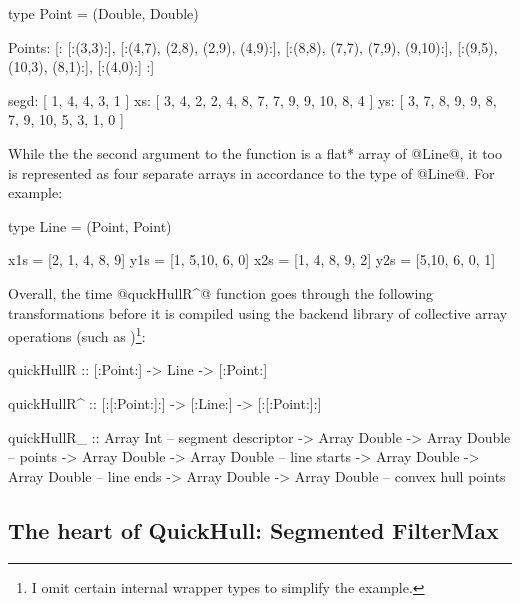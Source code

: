 \documentclass[preamble.tex]{subfiles}
\begin{document}
\begin{hscode}
type Point = (Double, Double)

Points:
  [:
     [:(3,3):],
     [:(4,7), (2,8),  (2,9), (4,9):],
     [:(8,8), (7,7),  (7,9), (9,10):],
     [:(9,5), (10,3), (8,1):],
     [:(4,0):]
  :]


segd: [ 1, 4, 4, 3, 1 ]
xs:   [ 3, 4, 2, 2, 4, 8, 7, 7,  9, 9, 10, 8, 4 ]
ys:   [ 3, 7, 8, 9, 9, 8, 7, 9, 10, 5,  3, 1, 0 ]
\end{hscode}


While the the second argument to the function is a \*flat* array of @Line@, it too is represented as four separate arrays in accordance to the type of @Line@. For example:


\begin{hscode}
type Line = (Point, Point)

x1s = [2, 1, 4, 8, 9]
y1s = [1, 5,10, 6, 0]
x2s = [1, 4, 8, 9, 2]
y2s = [5,10, 6, 0, 1]
\end{hscode}


Overall, the time @quckHullR^@ function goes through the following transformations before it is compiled using the backend library of collective array operations (such as \LiveFusion)\footnote{I omit certain internal wrapper types to simplify the example.}:

\begin{hscode}[literate={^}{{$^\uparrow$}}1,]
quickHullR  :: [:Point:] -> Line -> [:Point:]


quickHullR^ :: [:[:Point:]:] -> [:Line:] -> [:[:Point:]:]


quickHullR_ :: Array Int                      -- segment descriptor
            -> Array Double -> Array Double   -- points
            -> Array Double -> Array Double   -- line starts
            -> Array Double -> Array Double   -- line ends            
            -> Array Double -> Array Double   -- convex hull points
\end{hscode}



\subsection{The heart of QuickHull: Segmented FilterMax}
\label{sec:FilterMax}
\end{document}
